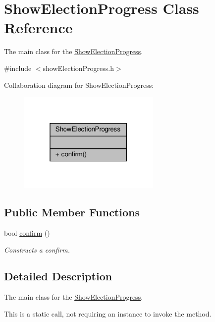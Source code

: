 \hypertarget{classShowElectionProgress}{}\section{Show\+Election\+Progress Class Reference}
\label{classShowElectionProgress}


The main class for the \hyperlink{classShowElectionProgress}{Show\+Election\+Progress}.  




{\ttfamily \#include $<$show\+Election\+Progress.\+h$>$}



Collaboration diagram for Show\+Election\+Progress\+:\nopagebreak
\begin{figure}[H]
\begin{center}
\leavevmode
\includegraphics[width=196pt]{classShowElectionProgress__coll__graph}
\end{center}
\end{figure}
\subsection*{Public Member Functions}
\begin{DoxyCompactItemize}
\item 
bool \hyperlink{classShowElectionProgress_aa14bd4850bef1167305d62c70632306a}{confirm} ()
\begin{DoxyCompactList}\small\item\em Constructs a confirm. \end{DoxyCompactList}\end{DoxyCompactItemize}


\subsection{Detailed Description}
The main class for the \hyperlink{classShowElectionProgress}{Show\+Election\+Progress}. 

This is a static call, not requiring an instance to invoke the method. 

